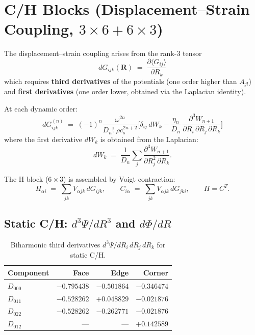 \documentclass[11pt,a4paper]{article}
\newcommand{\bR}{\bm{R}}
\theoremstyle{plain}
\theoremstyle{remark}
\begin{document}
\section{C/H Blocks (Displacement--Strain Coupling, $3\times 6 + 6\times 3$)}
\label{sec:CH-block}

The displacement--strain coupling arises from the rank-3 tensor
\begin{equation}
  dG_{ijk}(\bR) \;=\;
  \frac{\partial\langle G_{ij}\rangle}{\partial R_k}
  \label{eq:dG-def}
\end{equation}
which requires \textbf{third derivatives} of the potentials (one
order higher than $A_{jl}$) and \textbf{first derivatives} (one
order lower, obtained via the Laplacian identity).

At each dynamic order:
\begin{equation}
  \boxed{
  dG^{(n)}_{ijk} \;=\;
  (-1)^n \frac{\omega^{2n}}{D_n!\;\rho c_s^{2n+2}}
  \biggl[
    \delta_{ij}\,dW_k
  - \frac{\eta_n}{D_n}\,
    \frac{\partial^3 W_{n+1}}{\partial R_i\,\partial R_j\,\partial R_k}
  \biggr]
  }
  \label{eq:dGijk-assembly}
\end{equation}
where the first derivative $dW_k$ is obtained from the Laplacian:
\begin{equation}
  dW_k \;=\; \frac{1}{D_n}\sum_j
  \frac{\partial^3 W_{n+1}}{\partial R_j^2\,\partial R_k}.
  \label{eq:dW-laplacian}
\end{equation}

The H block ($6\times 3$) is assembled by Voigt contraction:
\begin{equation}
  H_{\alpha i} \;=\; \sum_{jk} V_{\alpha jk}\,dG_{ijk},
  \qquad
  C_{i\alpha} \;=\; \sum_{jk} V_{\alpha jk}\,dG_{jki},
  \qquad
  H = C^T.
  \label{eq:CH-voigt}
\end{equation}

\subsection{Static C/H: $d^3\Psi/dR^3$ and $d\Phi/dR$}

\begin{table}[ht]
\centering
\caption{Biharmonic third derivatives $d^3\Psi/dR_i\,dR_j\,dR_k$ for static C/H.}
\label{tab:d3psi}
\begin{tabular}{l*{3}{r}}
\toprule
Component & Face & Edge & Corner \\
\midrule
$D_{000}$ & $-0.795438$ & $-0.501864$ & $-0.346474$ \\
$D_{011}$ & $-0.528262$ & $+0.048829$ & $-0.021876$ \\
$D_{022}$ & $-0.528262$ & $-0.262771$ & $-0.021876$ \\
$D_{012}$ & --- & --- & $+0.142589$ \\
\bottomrule
\end{tabular}
\end{table}
\end{document}

